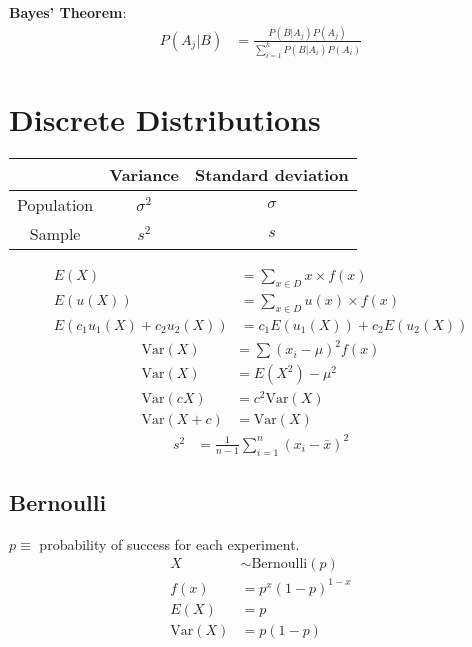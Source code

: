 \documentclass{article}
\newcommand{\var}{\text{Var}}
\newcommand{\bernoulli}{\text{Bernoulli}}
\begin{document}
\begin{multicols*}{2}
\textbf{Bayes' Theorem}:
\begin{align*}
    P(A_j|B) &= \frac{P(B|A_j) P(A_j)}{\sum_{i = 1}^k P(B|A_i) P(A_i)}
\end{align*}

\section{Discrete Distributions}

\begin{center}
    \begin{tabular}{|c|c|c|}
        \hline
                   & Variance   & Standard deviation \\ \hline
        Population & $\sigma^2$ & $\sigma$           \\ \hline
        Sample     & $s^2$      & $s$                \\ \hline
    \end{tabular}
\end{center}
\begin{align*}
    E(X) &= \sum_{x \in D} x \times f(x) \\
    E(u(X)) &= \sum_{x \in D} u(x) \times f(x) \\
    E(c_1 u_1(X) + c_2 u_2(X)) &= c_1 E(u_1(X)) + c_2 E(u_2(X))
\end{align*}
\begin{align*}
    \var(X) &= \sum (x_i - \mu)^2 f(x) \\
    \var(X) &= E(X^2) - \mu^2 \\
    \var(cX) &= c^2 \var(X) \\
    \var(X + c) &= \var(X)
\end{align*}
\begin{align*}
    s^2 &= \frac{1}{n - 1} \sum_{i = 1}^n (x_i - \bar{x})^2
\end{align*}

\subsection{Bernoulli}

$p \equiv$ probability of success for each experiment.
\begin{align*}
    X &\sim \bernoulli(p) \\
    f(x) &= p^x (1-p)^{1-x} \\
    E(X) &= p \\
    \var(X) &= p(1-p)
\end{align*}


\end{multicols*}
\end{document}
